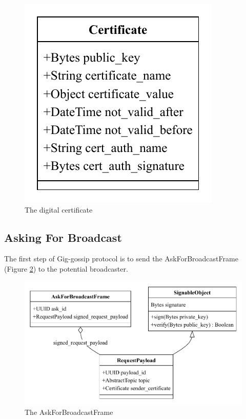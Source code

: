 \documentclass{article}
\begin{document}
\begin{figure}
	\centering
	\includegraphics[scale=0.7]{Certificate.pdf}
	\caption{The digital certificate}
	\label{fig:fr:certificate}
\end{figure}

\subsection{Asking For Broadcast}
The first step of Gig-gossip protocol is to send the AskForBroadcastFrame (Figure \ref{fig:fr:askforbroadcast}) to the potential broadcaster.

\begin{figure}
	\centering
	\includegraphics[scale=0.7]{AskForBroadcast.pdf}
	\caption{The AskForBroadcastFrame}
	\label{fig:fr:askforbroadcast}
\end{figure}
\end{document}
